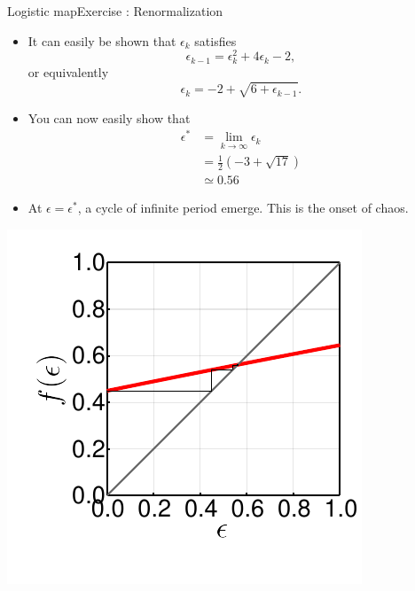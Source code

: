 \documentclass[usenames,dvipsnames,svgnames,10pt,aspectratio=169]{beamer}
\begin{document}
\begin{frame}[t, c]{Logistic map}{Exercise : Renormalization}
	\begin{minipage}{.68\textwidth}
		\begin{itemize}
			\item It can easily be shown that \( \epsilon_k \) satisfies
			\[
				\epsilon_{k-1} = \epsilon_k^2 + 4\epsilon_k -2,
			\]
			or equivalently
			\[
				\epsilon_{k} = -2 + \sqrt{6 + \epsilon_{k-1}}.
			\]
			\item You can now easily show that
			\[
				\begin{aligned}
					\epsilon^* & = \lim_{k\to\infty} \epsilon_k \\
					& = \frac{1}{2} \left( -3 + \sqrt{17} \right) \\
					& \simeq 0.56
				\end{aligned}
			\]

			\item At \( \epsilon = \epsilon^* \), a cycle of infinite period emerge. This is the onset of chaos.
		\end{itemize}
	\end{minipage}%
	\hfill
	\begin{minipage}{.28\textwidth}
		\includegraphics[width=\textwidth]{renormalization_epsilon_sequence}
	\end{minipage}

	\vspace{1cm}
\end{frame}
\end{document}

